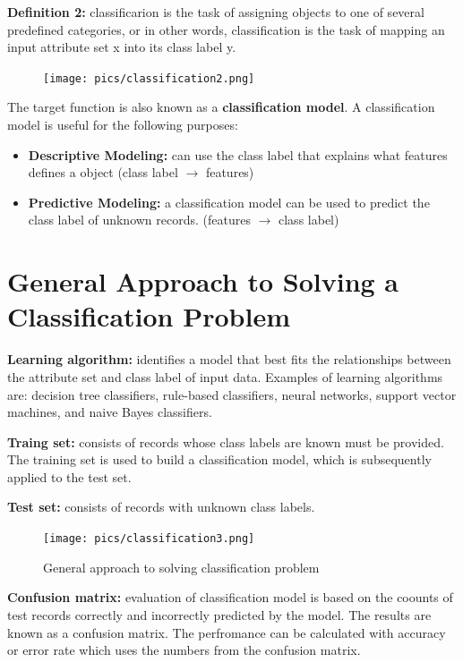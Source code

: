 		{\bf Definition 2:} classificarion is the task of assigning objects to one of several
		predefined categories, or in other words, classification is the task
		of mapping an input attribute set x into its class label y.

	\begin{figure}[H]
		\centering
		\texttt{[image: pics/classification2.png]}
	\end{figure}

		The target function is also known as a {\bf classification model}.
		A classification model is useful for the following purposes:
			\begin{itemize}
				\item {\bf Descriptive Modeling:} can use the class label that
				explains what features defines a object (class label $\rightarrow$ features)				
				\item {\bf Predictive Modeling:} a classification model can be
				used to predict the class label of unknown records. (features $\rightarrow$ class label)
			\end{itemize}

	\clearpage	
	\section{General Approach to Solving a Classification Problem}

		{\bf Learning algorithm:} identifies a model that best fits the relationships
		between the attribute set and class label of input data. Examples of learning 
		algorithms are: decision tree classifiers, rule-based classifiers, neural networks, 
		support vector machines, and naive Bayes classifiers. 

		{\bf Traing set:} consists of records whose class labels are known must be provided.
		The training set is used to build a classification model, which is subsequently applied
		to the test set.

		{\bf Test set:} consists of records with unknown class labels.

		\begin{figure}[H]
			\texttt{[image: pics/classification3.png]}
			\caption{General approach to solving classification problem}
		\end{figure}

		{\bf Confusion matrix:} evaluation of classification model is based on the coounts of
		test records correctly and incorrectly predicted by the model. The results are known
		as a confusion matrix. The perfromance can be calculated with accuracy or error rate
		which uses the numbers from the confusion matrix. 

